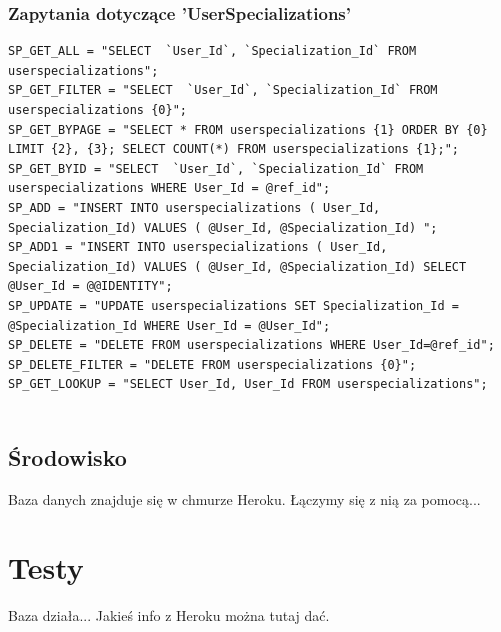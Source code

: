 \documentclass[12pt,a4paper]{article}
\begin{document}
			\subsubsection{Zapytania dotyczące 'UserSpecializations'}
			\begin{lstlisting}
SP_GET_ALL = "SELECT  `User_Id`, `Specialization_Id` FROM userspecializations";
SP_GET_FILTER = "SELECT  `User_Id`, `Specialization_Id` FROM userspecializations {0}";
SP_GET_BYPAGE = "SELECT * FROM userspecializations {1} ORDER BY {0} LIMIT {2}, {3}; SELECT COUNT(*) FROM userspecializations {1};";
SP_GET_BYID = "SELECT  `User_Id`, `Specialization_Id` FROM userspecializations WHERE User_Id = @ref_id";
SP_ADD = "INSERT INTO userspecializations ( User_Id, Specialization_Id) VALUES ( @User_Id, @Specialization_Id) ";
SP_ADD1 = "INSERT INTO userspecializations ( User_Id, Specialization_Id) VALUES ( @User_Id, @Specialization_Id) SELECT @User_Id = @@IDENTITY";
SP_UPDATE = "UPDATE userspecializations SET Specialization_Id = @Specialization_Id WHERE User_Id = @User_Id";
SP_DELETE = "DELETE FROM userspecializations WHERE User_Id=@ref_id";
SP_DELETE_FILTER = "DELETE FROM userspecializations {0}";
SP_GET_LOOKUP = "SELECT User_Id, User_Id FROM userspecializations";
			
			\end{lstlisting}
		\subsection{Środowisko}
			Baza danych znajduje się w chmurze Heroku. Łączymy się z nią za pomocą...
	\section{Testy}
		Baza działa... Jakieś info z Heroku można tutaj dać.
\end{document}
